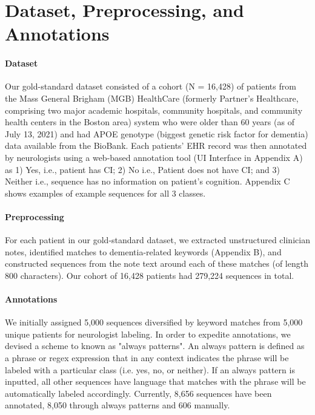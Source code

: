 \documentclass[pmlr,twocolumn,10pt]{jmlr} %
\begin{document}
\section{Dataset, Preprocessing, and Annotations}
\label{sec:Dataset+Preprocessing+Annotations}

\paragraph{Dataset}
\label{sec:Dataset} Our gold-standard dataset consisted of a cohort (N = 16,428) of patients from the Mass General Brigham (MGB) HealthCare (formerly Partner's Healthcare, comprising two major academic hospitals, community hospitals, and community health centers in the Boston area) system who were older than 60 years (as of July 13, 2021) and had APOE genotype (biggest genetic risk factor for dementia) data available from the BioBank. Each patients' EHR record was then annotated by neurologists using a web-based annotation tool (UI Interface in Appendix A) as 1) Yes, i.e., patient has CI; 2) No i.e., Patient does not have CI; and 3) Neither i.e., sequence has no information on patient’s cognition. 
Appendix C shows examples of example sequences for all 3 classes. 

\paragraph{Preprocessing}
\label{sec:Preprocessing} For each patient in our gold-standard dataset, we extracted unstructured clinician notes, identified matches to dementia-related keywords (Appendix B), and constructed sequences from the note text around each of these matches (of length 800 characters). Our cohort of 16,428 patients had 279,224 sequences in total. 

\paragraph{Annotations}
\label{sec:Annotations} We initially assigned 5,000 sequences diversified by keyword matches from 5,000 unique patients for neurologist labeling. In order to expedite annotations, we devised a scheme to known as "always patterns". An always pattern is defined as a phrase or regex expression that in any context indicates the phrase will be labeled with a particular class (i.e. yes, no, or neither). If an always pattern is inputted, all other sequences have language that matches with the phrase will be automatically labeled accordingly. Currently, 8,656 sequences have been annotated, 8,050 through always patterns and 606 manually. %
\end{document}
